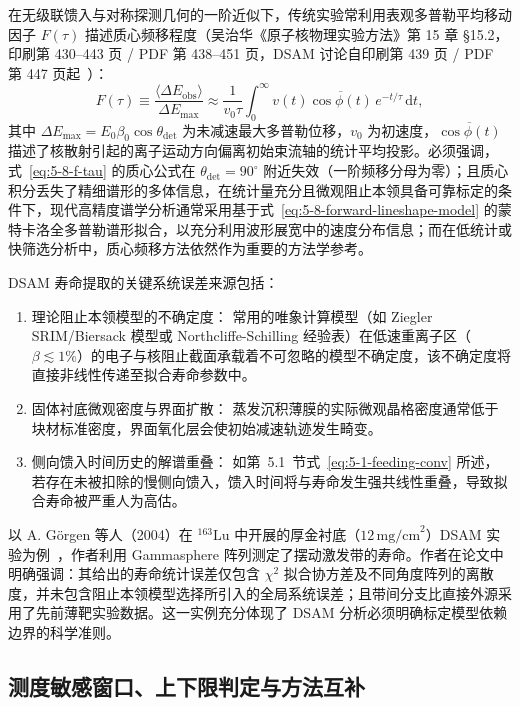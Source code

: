 在无级联馈入与对称探测几何的一阶近似下，传统实验常利用表观多普勒平均移动因子 $F(\tau)$ 描述质心频移程度（吴治华《原子核物理实验方法》第 15 章 §15.2，印刷第 430–443 页 / PDF 第 438–451 页，DSAM 讨论自印刷第 439 页 / PDF 第 447 页起~\cite{book-wu-nuclear-experiment-methods}）：
\begin{equation}\label{eq:5-8-f-tau}
F(\tau) \equiv \frac{\langle \Delta E_{\mathrm{obs}} \rangle}{\Delta E_{\max}} \approx \frac{1}{v_0 \tau} \int_0^\infty v(t) \overline{\cos\phi(t)} \, e^{-t/\tau} \, \mathrm{d}t,
\end{equation}
其中 $\Delta E_{\max} = E_0 \beta_0 \cos\theta_{\mathrm{det}}$ 为未减速最大多普勒位移，$v_0$ 为初速度，$\overline{\cos\phi(t)}$ 描述了核散射引起的离子运动方向偏离初始束流轴的统计平均投影。必须强调，式~\eqref{eq:5-8-f-tau} 的质心公式在 $\theta_{\mathrm{det}} = 90^\circ$ 附近失效（一阶频移分母为零）；且质心积分丢失了精细谱形的多体信息，在统计量充分且微观阻止本领具备可靠标定的条件下，现代高精度谱学分析通常采用基于式~\eqref{eq:5-8-forward-lineshape-model} 的蒙特卡洛全多普勒谱形拟合，以充分利用波形展宽中的速度分布信息；而在低统计或快筛选分析中，质心频移方法依然作为重要的方法学参考。

DSAM 寿命提取的关键系统误差来源包括：
\begin{enumerate}
\item 理论阻止本领模型的不确定度：
常用的唯象计算模型（如 Ziegler SRIM/Biersack 模型或 Northcliffe-Schilling 经验表）在低速重离子区（$\beta \lesssim 1\%$）的电子与核阻止截面承载着不可忽略的模型不确定度，该不确定度将直接非线性传递至拟合寿命参数中。
\item 固体衬底微观密度与界面扩散：
蒸发沉积薄膜的实际微观晶格密度通常低于块材标准密度，界面氧化层会使初始减速轨迹发生畸变。
\item 侧向馈入时间历史的解谱重叠：
如第~5.1~节式~\eqref{eq:5-1-feeding-conv} 所述，若存在未被扣除的慢侧向馈入，馈入时间将与寿命发生强共线性重叠，导致拟合寿命被严重人为高估。
\end{enumerate}

以 A. Görgen 等人（2004）在 $^{163}\mathrm{Lu}$ 中开展的厚金衬底（$12\,\text{mg/cm}^2$）DSAM 实验为例~\cite{campaign-g07-gorgen-2004-163lu-quadrupole-moments}，作者利用 Gammasphere 阵列测定了摆动激发带的寿命。作者在论文中明确强调：其给出的寿命统计误差仅包含 $\chi^2$ 拟合协方差及不同角度阵列的离散度，并未包含阻止本领模型选择所引入的全局系统误差；且带间分支比直接外源采用了先前薄靶实验数据。这一实例充分体现了 DSAM 分析必须明确标定模型依赖边界的科学准则。

\subsection{测度敏感窗口、上下限判定与方法互补}\label{subsec:5-8-4}

